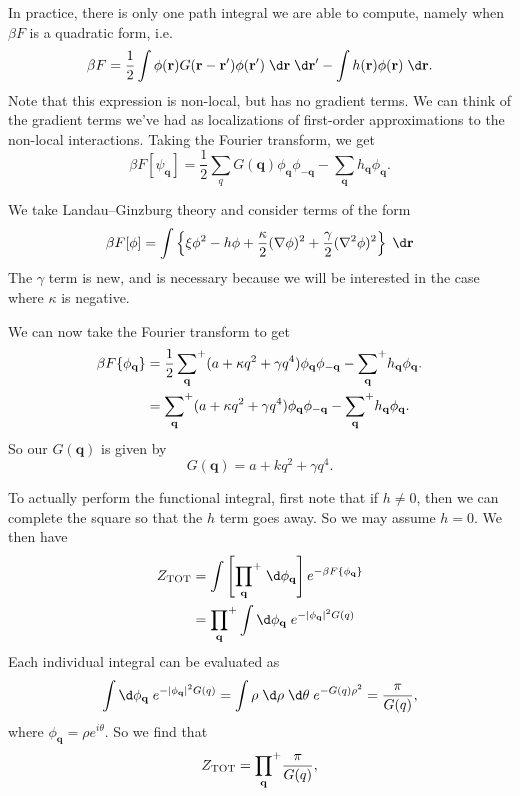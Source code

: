 \documentclass[a4paper]{article}
\newcommand\splus{\!{\vphantom{\prod}}^+}
\begin{document}
In practice, there is only one path integral we are able to compute, namely when $\beta F$ is a quadratic form, i.e.
\[
  \beta F = \frac{1}{2} \int \phi(\mathbf{r}) G(\mathbf{r} - \mathbf{r}') \phi(\mathbf{r}')\;\d \mathbf{r}\;\d \mathbf{r}' - \int h(\mathbf{r}) \phi(\mathbf{r})\;\d \mathbf{r}.
\]
Note that this expression is non-local, but has no gradient terms. We can think of the gradient terms we've had as localizations of first-order approximations to the non-local interactions. Taking the Fourier transform, we get
\[
  \beta F[\psi_\mathbf{q}] = \frac{1}{2} \sum_q G(\mathbf{q}) \phi_\mathbf{q} \phi_{-\mathbf{q}} - \sum_\mathbf{q} h_\mathbf{q} \phi_\mathbf{q}.
\]
\begin{eg}
  We take Landau--Ginzburg theory and consider terms of the form
  \[
    \beta F[\phi] = \int \left\{\xi \phi^2 - h \phi + \frac{\kappa}{2} (\nabla \phi)^2 + \frac{\gamma}{2} (\nabla^2 \phi)^2\right\}\;\d \mathbf{r}
  \]
  The $\gamma$ term is new, and is necessary because we will be interested in the case where $\kappa$ is negative.

  We can now take the Fourier transform to get
  \begin{align*}
    \beta F \{\phi_\mathbf{q}\} &= \frac{1}{2} \sum_\mathbf{q}\splus (a + \kappa q^2 + \gamma q^4) \phi_\mathbf{q} \phi_{-\mathbf{q}} - \sum_\mathbf{q}\splus h_\mathbf{q} \phi_\mathbf{q}.\\
    &= \sum_\mathbf{q}\splus (a + \kappa q^2 + \gamma q^4) \phi_\mathbf{q} \phi_{-\mathbf{q}} - \sum_\mathbf{q}\splus h_\mathbf{q} \phi_\mathbf{q}.
  \end{align*}
  So our $G(\mathbf{q})$ is given by
  \[
    G(\mathbf{q}) = a + k q^2 + \gamma q^4.
  \]
\end{eg}
To actually perform the functional integral, first note that if $h \not= 0$, then we can complete the square so that the $h$ term goes away. So we may assume $h = 0$. We then have
\begin{align*}
  Z_{\mathrm{TOT}} &= \int \left[ \prod_{\mathbf{q}}\splus \;\d \phi_\mathbf{q}\right] e^{-\beta F\{\phi_\mathbf{q}\}}\\
  &= \prod_\mathbf{q}\splus \int \d \phi_\mathbf{q}\;e^{-|\phi_\mathbf{q}|^2 G(q)}
\end{align*}
Each individual integral can be evaluated as
\[
  \int \d \phi_\mathbf{q}\;e^{-|\phi_\mathbf{q}|^2 G(q)} = \int \rho \;\d \rho \;\d \theta\; e^{-G(q) \rho^2} = \frac{\pi}{G(q)},
\]
where $\phi_\mathbf{q} = \rho e^{i\theta}$. So we find that
\[
  Z_{\mathrm{TOT}} = \prod_\mathbf{q}\splus \frac{\pi}{G(q)},
\]
\end{document}
